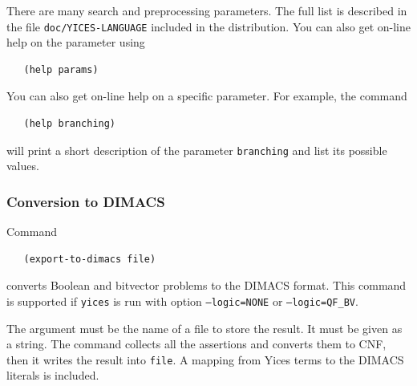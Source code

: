 \documentclass[11pt,twoside,fleqn,openright,titlepage]{cslreport}
\begin{document}
\medskip\noindent
There are many search and preprocessing parameters. The full list is
described in the file \texttt{doc/YICES-LANGUAGE} included in the
distribution. You can also get on-line help on the parameter using
\begin{small}
\begin{verbatim}
   (help params)
\end{verbatim}
\end{small}
You can also get on-line help on a specific parameter. For example,
the command
\begin{small}
\begin{verbatim}
   (help branching)
\end{verbatim}
\end{small}
will print a short description of the parameter \texttt{branching} and
list its possible values.

\subsubsection*{Conversion to DIMACS}

Command
\begin{small}
\begin{verbatim}
   (export-to-dimacs file)
\end{verbatim}
\end{small}
converts Boolean and bitvector problems to the DIMACS format. This
command is supported if \texttt{yices} is run with option
\texttt{--logic=NONE} or \texttt{--logic=QF\_BV}.

\medskip\noindent The argument must be the name of a file to store the
result. It must be given as a string. The command collects all the
assertions and converts them to CNF, then it writes the result into
\texttt{file}. A mapping from Yices terms to the DIMACS literals is
included.
\end{document}
